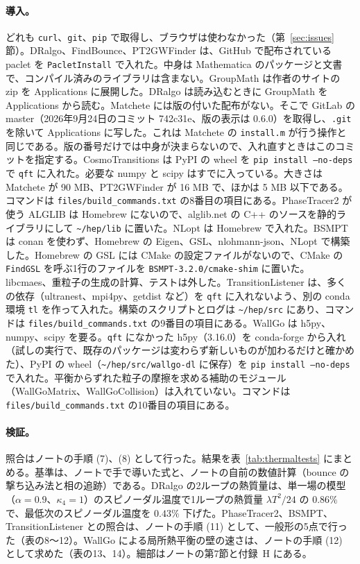 \documentclass[a4paper,10pt]{ltjsarticle}
\newcommand{\pth}[1]{\texttt{\textasciitilde/}\nolinkurl{#1}}
\begin{document}
\paragraph{導入。}どれも \texttt{curl}、\texttt{git}、\texttt{pip} で取得し、ブラウザは使わなかった（第~\ref{sec:issues} 節）。DRalgo、FindBounce、PT2GWFinder は、GitHub で配布されている paclet を \texttt{PacletInstall} で入れた。中身は Mathematica のパッケージと文書で、コンパイル済みのライブラリは含まない。GroupMath は作者のサイトの zip を Applications に展開した。DRalgo は読み込むときに GroupMath を Applications から読む。Matchete には版の付いた配布がない。そこで GitLab の master（2026年9月24日のコミット 742c31e、版の表示は 0.6.0）を取得し、\texttt{.git} を除いて Applications に写した。これは Matchete の \texttt{install.m} が行う操作と同じである。版の番号だけでは中身が決まらないので、入れ直すときはこのコミットを指定する。CosmoTransitions は PyPI の wheel を \texttt{pip install --no-deps} で \texttt{qft} に入れた。必要な numpy と scipy はすでに入っている。大きさは Matchete が 90 MB、PT2GWFinder が 16 MB で、ほかは 5 MB 以下である。コマンドは \nolinkurl{files/build_commands.txt} の8番目の項目にある。PhaseTracer2 が使う ALGLIB は Homebrew にないので、alglib.net の C++ のソースを静的ライブラリにして \pth{hep/lib} に置いた。NLopt は Homebrew で入れた。BSMPT は conan を使わず、Homebrew の Eigen、GSL、nlohmann-json、NLopt で構築した。Homebrew の GSL には CMake の設定ファイルがないので、CMake の \texttt{FindGSL} を呼ぶ1行のファイルを \nolinkurl{BSMPT-3.2.0/cmake-shim} に置いた。libcmaes、重粒子の生成の計算、テストは外した。TransitionListener は、多くの依存（ultranest、mpi4py、getdist など）を \texttt{qft} に入れないよう、別の conda 環境 \texttt{tl} を作って入れた。構築のスクリプトとログは \pth{hep/src} にあり、コマンドは \nolinkurl{files/build_commands.txt} の9番目の項目にある。WallGo は h5py、numpy、scipy を要る。\texttt{qft} になかった h5py（3.16.0）を conda-forge から入れ（試しの実行で、既存のパッケージは変わらず新しいものが加わるだけと確かめた）、PyPI の wheel（\pth{hep/src/wallgo-dl} に保存）を \texttt{pip install --no-deps} で入れた。平衡からずれた粒子の摩擦を求める補助のモジュール（WallGoMatrix、WallGoCollision）は入れていない。コマンドは \nolinkurl{files/build_commands.txt} の10番目の項目にある。

\paragraph{検証。}照合はノートの手順 (7)、(8) として行った。結果を表~\ref{tab:thermaltests} にまとめる。基準は、ノートで手で導いた式と、ノートの自前の数値計算（bounce の撃ち込み法と相の追跡）である。DRalgo の2ループの熱質量は、単一場の模型（$\alpha=0.9$、$\kappa_4=1$）のスピノーダル温度で1ループの熱質量 $\lambda T^2/24$ の $0.86\%$ で、最低次のスピノーダル温度を $0.43\%$ 下げた。PhaseTracer2、BSMPT、TransitionListener との照合は、ノートの手順 (11) として、一般形の5点で行った（表の8〜12）。WallGo による局所熱平衡の壁の速さは、ノートの手順 (12) として求めた（表の13、14）。細部はノートの第7節と付録~H にある。
\end{document}
